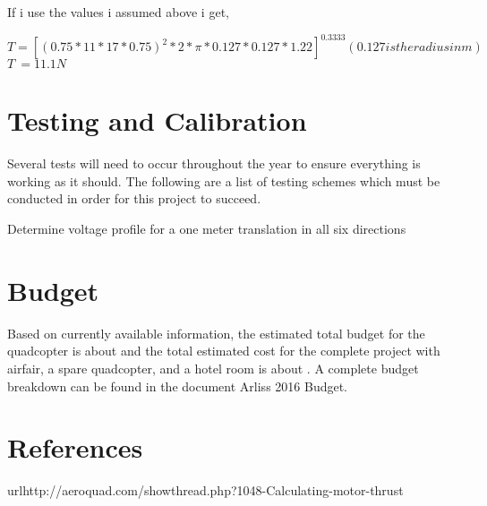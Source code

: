 \documentclass[10pt,a4paper]{article}
\begin{document}
If i use the values i assumed above i get,

$T = [(0.75*11*17*0.75)^2 * 2 * \pi * 0.127 *0.127 * 1.22]^{0.3333} (0.127 is the radius in m)$
$T ~= 11.1 N$

\section{Testing and Calibration}
Several tests will need to occur throughout the year to ensure everything is working as it should. The following are a list of testing schemes which must be conducted in order for this project to succeed.


Determine voltage profile for a one meter translation in all six directions

\section{Budget}

Based on currently available information, the estimated total budget for the quadcopter is about  and the total estimated cost for the complete project with airfair, a spare quadcopter, and a hotel room is about . A complete budget breakdown can be found in the document Arliss 2016 Budget.


\section{References}
url{http://aeroquad.com/showthread.php?1048-Calculating-motor-thrust}
\end{document}
